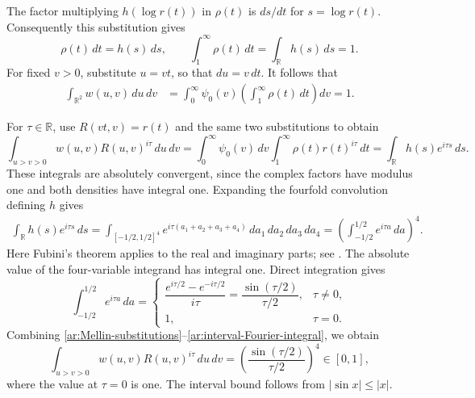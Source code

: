 \documentclass[twoside]{aomart}
\theoremstyle{paperplain}
\theoremstyle{paperdefinition}
\newcommand{\R}{\mathbb R}
\numberwithin{equation}{section}
\begin{document}
The factor multiplying $h(\log r(t))$ in $\rho(t)$ is
$ds/dt$ for $s=\log r(t)$. Consequently this substitution gives
\begin{equation*}
 \rho(t)\,dt=h(s)\,ds,\qquad
 \int_1^\infty\rho(t)\,dt=\int_\R h(s)\,ds=1.
\end{equation*}
For fixed $v>0$, substitute $u=vt$, so that $du=v\,dt$.
It follows that
\begin{equation*}
 \begin{aligned}
 \int_{\R^2}w(u,v)\,du\,dv
 &=\int_0^\infty\psi_0(v)
          \left(\int_1^\infty\rho(t)\,dt\right)dv=1.
 \end{aligned}
\end{equation*}

For $\tau\in\R$, use $R(vt,v)=r(t)$ and the same two
substitutions to obtain
\begin{equation}
 \int_{u>v>0}w(u,v)R(u,v)^{i\tau}\,du\,dv=\int_0^\infty\psi_0(v)\,dv\int_1^\infty\rho(t)r(t)^{i\tau}\,dt=\int_\R h(s)e^{i\tau s}\,ds.
 \label{ar:Mellin-substitutions}
\end{equation}
These integrals are absolutely convergent, since the complex
factors have modulus one and both densities have integral one.
Expanding the fourfold convolution defining $h$ gives
\begin{equation*}
 \begin{aligned}
 \int_\R h(s)e^{i\tau s}\,ds
 =\int_{[-1/2,1/2]^4}
       e^{i\tau(a_1+a_2+a_3+a_4)}\,da_1\,da_2\,da_3\,da_4
 =\left(\int_{-1/2}^{1/2}e^{i\tau a}\,da\right)^4.
 \end{aligned}
\end{equation*}
Here Fubini's theorem applies to the real and imaginary parts;
see \cite[Theorem~5.32, p.~132]{AxlerMeasure}.
The absolute value of the four-variable integrand has integral
one. Direct integration gives
\begin{equation}
 \int_{-1/2}^{1/2}e^{i\tau a}\,da
 =\begin{cases}
 \dfrac{e^{i\tau/2}-e^{-i\tau/2}}{i\tau}
       =\dfrac{\sin(\tau/2)}{\tau/2},&\tau\ne0,\\[6pt]
 1,&\tau=0.
 \end{cases}
 \label{ar:interval-Fourier-integral}
\end{equation}
Combining \eqref{ar:Mellin-substitutions}--\eqref{ar:interval-Fourier-integral},
we obtain
\begin{equation}
 \int_{u>v>0}w(u,v)R(u,v)^{i\tau}\,du\,dv
 =\left(\frac{\sin(\tau/2)}{\tau/2}\right)^4\in[0,1],
 \label{ar:Mellin}
\end{equation}
where the value at $\tau=0$ is one. The interval bound follows
from $|\sin x|\le|x|$.
\end{document}

